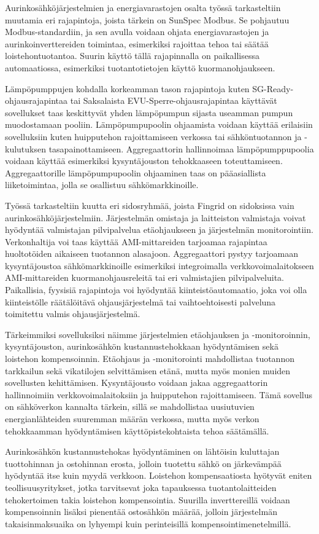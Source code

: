 Aurinkosähköjärjestelmien ja energiavarastojen osalta työssä tarkasteltiin muutamia eri rajapintoja, joista tärkein on SunSpec Modbus. Se pohjautuu Modbus-standardiin, ja sen avulla voidaan ohjata energiavarastojen ja aurinkoinverttereiden toimintaa, esimerkiksi rajoittaa tehoa tai säätää loistehontuotantoa. Suurin käyttö tällä rajapinnalla on paikallisessa automaatiossa, esimerkiksi tuotantotietojen käyttö kuormanohjaukseen.

Lämpöpumppujen kohdalla korkeamman tason rajapintoja kuten SG-Ready-ohjausrajapintaa tai Saksalaista EVU-Sperre-ohjausrajapintaa käyttävät sovellukset taas keskittyvät yhden lämpöpumpun sijasta useamman pumpun muodostamaan pooliin. Lämpöpumpupoolin ohjaamista voidaan käyttää erilaisiin sovelluksiin kuten huipputehon rajoittamiseen verkossa tai sähköntuotannon ja -kulutuksen tasapainottamiseen. Aggregaattorin hallinnoimaa lämpöpumppupoolia voidaan käyttää esimerkiksi kysyntäjouston tehokkaaseen toteuttamiseen. Aggregaattorille lämpöpumpupoolin ohjaaminen taas on pääasiallista liiketoimintaa, jolla se osallistuu sähkömarkkinoille.

Työssä tarkasteltiin kuutta eri sidosryhmää, joista Fingrid on sidoksissa vain aurinkosähköjärjestelmiin. Järjestelmän omistaja ja laitteiston valmistaja voivat hyödyntää valmistajan pilvipalvelua etäohjaukseen ja järjestelmän monitorointiin. Verkonhaltija voi taas käyttää AMI-mittareiden tarjoamaa rajapintaa huoltotöiden aikaiseen tuotannon alasajoon. Aggregaattori pystyy tarjoamaan kysyntäjoustoa sähkömarkkinoille esimerkiksi integroimalla verkkovoimalaitokseen AMI-mittareiden kuormanohjausreleitä tai eri valmistajien pilvipalveluita. Paikallisia, fyysisiä rajapintoja voi hyödyntää kiinteistöautomaatio, joka voi olla kiinteistölle räätälöitävä ohjausjärjestelmä tai vaihtoehtoisesti palveluna toimitettu valmis ohjausjärjestelmä.

Tärkeimmiksi sovelluksiksi näimme järjestelmien etäohjauksen ja -monitoroinnin, kysyntäjouston, aurinkosähkön kustannustehokkaan hyödyntämisen sekä loistehon kompensoinnin. Etäohjaus ja -monitorointi mahdollistaa tuotannon tarkkailun sekä vikatilojen selvittämisen etänä, mutta myös monien muiden sovellusten kehittämisen. Kysyntäjousto voidaan jakaa aggregaattorin hallinnoimiin verkkovoimalaitoksiin ja huipputehon rajoittamiseen. Tämä sovellus on sähköverkon kannalta tärkein, sillä se mahdollistaa uusiutuvien energianlähteiden suuremman määrän verkossa, mutta myös verkon tehokkaamman hyödyntämisen käyttöpistekohtaista tehoa säätämällä. 

Aurinkosähkön kustannustehokas hyödyntäminen on lähtöisin kuluttajan tuottohinnan ja ostohinnan erosta, jolloin tuotettu sähkö on järkevämpää hyödyntää itse kuin myydä verkkoon. Loistehon kompensaatiosta hyötyvät eniten teollisuusyritykset, jotka tarvitsevat joka tapauksessa tuotantolaitteiden tehokertoimen takia loistehon kompensointia. Suurilla inverttereillä voidaan kompensoinnin lisäksi pienentää ostosähkön määrää, jolloin järjestelmän takaisinmaksuaika on lyhyempi kuin perinteisillä kompensointimenetelmillä.
